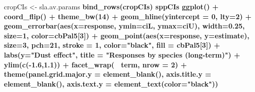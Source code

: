 \documentclass[]{scrartcl}
\newenvironment{Shaded}{\begin{snugshade}}{\end{snugshade}}
\newcommand{\CharTok}[1]{\textcolor[rgb]{0.31,0.60,0.02}{#1}}
\newcommand{\DataTypeTok}[1]{\textcolor[rgb]{0.13,0.29,0.53}{#1}}
\newcommand{\DecValTok}[1]{\textcolor[rgb]{0.00,0.00,0.81}{#1}}
\newcommand{\FloatTok}[1]{\textcolor[rgb]{0.00,0.00,0.81}{#1}}
\newcommand{\KeywordTok}[1]{\textcolor[rgb]{0.13,0.29,0.53}{\textbf{#1}}}
\newcommand{\NormalTok}[1]{#1}
\newcommand{\OperatorTok}[1]{\textcolor[rgb]{0.81,0.36,0.00}{\textbf{#1}}}
\newcommand{\StringTok}[1]{\textcolor[rgb]{0.31,0.60,0.02}{#1}}
\begin{document}
\begin{Shaded}
\begin{Highlighting}[]
{{{{{{{{{{{{{{{{{{{{{{{{{{{{{{{{{{{{{{{{{{{{{{{{{{{{{{{{{{{{{{{{{{{{{{{{{{{\NormalTok{  cropCIs <-}\StringTok{ }
\StringTok{     }\NormalTok{sla.av.params }\OperatorTok{%
\StringTok{        }\KeywordTok{bind_rows}\NormalTok{(cropCIs)}
\NormalTok{  sppCIs }\OperatorTok{%
\StringTok{  }\KeywordTok{ggplot}\NormalTok{() }\OperatorTok{+}
\StringTok{  }\KeywordTok{coord_flip}\NormalTok{() }\OperatorTok{+}\StringTok{  }\KeywordTok{theme_bw}\NormalTok{(}\DecValTok{14}\NormalTok{) }\OperatorTok{+}
\StringTok{  }\KeywordTok{geom_hline}\NormalTok{(}\DataTypeTok{yintercept =} \DecValTok{0}\NormalTok{, }\DataTypeTok{lty=}\DecValTok{2}\NormalTok{) }\OperatorTok{+}\StringTok{ }
\StringTok{      }\KeywordTok{geom_errorbar}\NormalTok{(}\KeywordTok{aes}\NormalTok{(}\DataTypeTok{x=}\NormalTok{response,}
               \DataTypeTok{ymin=}\NormalTok{ciL, }\DataTypeTok{ymax=}\NormalTok{ciU), }
                 \DataTypeTok{width=}\FloatTok{0.25}\NormalTok{, }
               \DataTypeTok{size=}\DecValTok{1}\NormalTok{, }
               \DataTypeTok{color=}\NormalTok{cbPal5[}\DecValTok{3}\NormalTok{]) }\OperatorTok{+}
\StringTok{   }\KeywordTok{geom_point}\NormalTok{(}\KeywordTok{aes}\NormalTok{(}\DataTypeTok{x=}\NormalTok{response, }\DataTypeTok{y=}\NormalTok{estimate), }
              \DataTypeTok{size=}\DecValTok{3}\NormalTok{, }
                \DataTypeTok{pch=}\DecValTok{21}\NormalTok{, }
                \DataTypeTok{stroke =} \DecValTok{1}\NormalTok{, }
                \DataTypeTok{color=}\StringTok{"black"}\NormalTok{, }
                \DataTypeTok{fill =}\NormalTok{ cbPal5[}\DecValTok{3}\NormalTok{]) }\OperatorTok{+}\StringTok{ }
\StringTok{   }\KeywordTok{labs}\NormalTok{(}\DataTypeTok{y=}\StringTok{"Dust effect"}\NormalTok{, }
        \DataTypeTok{title =} \StringTok{"Responses by species (long-term)"}\NormalTok{) }\OperatorTok{+}
\StringTok{  }\KeywordTok{ylim}\NormalTok{(}\KeywordTok{c}\NormalTok{(}\OperatorTok{-}\FloatTok{1.6}\NormalTok{,}\FloatTok{1.1}\NormalTok{)) }\OperatorTok{+}\StringTok{ }
\StringTok{    }\KeywordTok{facet_wrap}\NormalTok{(}\OperatorTok{~}\StringTok{ }\NormalTok{term, }\DataTypeTok{nrow =} \DecValTok{2}\NormalTok{) }\OperatorTok{+}\StringTok{ }
\StringTok{   }\KeywordTok{theme}\NormalTok{(}\DataTypeTok{panel.grid.major.y =} \KeywordTok{element_blank}\NormalTok{(),}
         \DataTypeTok{axis.title.y =} \KeywordTok{element_blank}\NormalTok{(), }
         \DataTypeTok{axis.text.y =} \KeywordTok{element_text}\NormalTok{(}\DataTypeTok{color=}\StringTok{"black"}\NormalTok{)) }
}}}}}}}}}}}}}}}}}}}}}}}}}}}}}}}}}}}}}}}}}}}}}}}}}}}}}}}}}}}}}}}}}}}}}}}}}}}}}
\end{Highlighting}
\end{Shaded}
\end{document}
